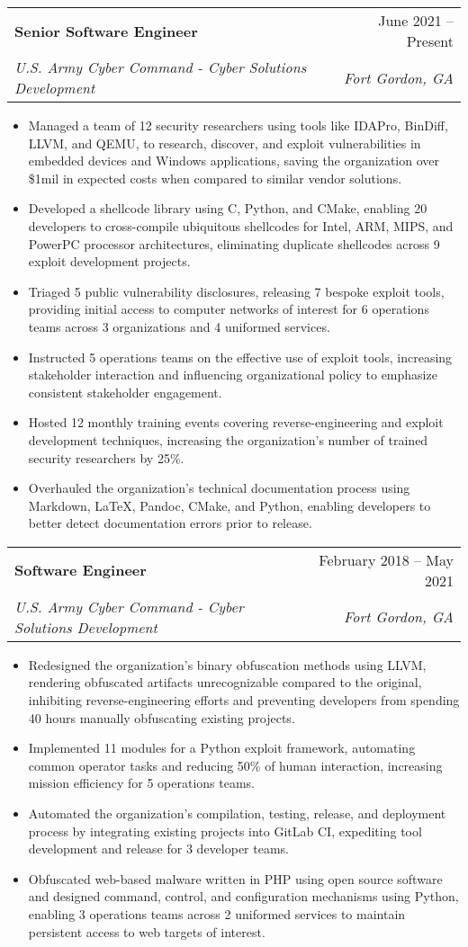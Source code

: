 \documentclass[letterpaper,11pt]{article}
\makeatletter
\newcommand{\resumeItem}[1]{
  \item[-] \small{
    {#1 \vspace{-2pt}}
  }
}
\newcommand{\resumeSubheading}[4]{
  \vspace{-2pt}\item
    \begin{tabular*}{0.97\textwidth}[t]{l@{\extracolsep{\fill}}r}
      \textbf{#1} & #2 \\
      \textit{\small#3} & \textit{\small #4} \\
    \end{tabular*}\vspace{-7pt}
}
\newcommand{\resumeItemListStart}{\begin{itemize}[rightmargin=\dimexpr\linewidth-17cm-\leftmargin\relax]}
\newcommand{\resumeItemListEnd}{\end{itemize}\vspace{-5pt}}
\makeatother
\begin{document}
\resumeSubheading
{Senior Software Engineer}{June 2021 – Present}
{U.S. Army Cyber Command - Cyber Solutions Development}{Fort Gordon, GA}
\resumeItemListStart
\resumeItem{Managed a team of 12 security researchers using tools like IDAPro, BinDiff, LLVM, and QEMU, to research, discover, and exploit vulnerabilities in embedded devices and Windows applications, saving the organization over \$1mil in expected costs when compared to similar vendor solutions.}
\resumeItem{Developed a shellcode library using C, Python, and CMake, enabling 20 developers to cross-compile ubiquitous shellcodes for Intel, ARM, MIPS, and PowerPC processor architectures, eliminating duplicate shellcodes across 9 exploit development projects.}
\resumeItem{Triaged 5 public vulnerability disclosures, releasing 7 bespoke exploit tools, providing initial access to computer networks of interest for 6 operations teams across 3 organizations and 4 uniformed services.}
\resumeItem{Instructed 5 operations teams on the effective use of exploit tools, increasing stakeholder interaction and influencing organizational policy to emphasize consistent stakeholder engagement.}
\resumeItem{Hosted 12 monthly training events covering reverse-engineering and exploit development techniques, increasing the organization's number of trained security researchers by 25\%.}
\resumeItem{Overhauled the organization's technical documentation process using Markdown, LaTeX, Pandoc, CMake, and Python, enabling developers to better detect documentation errors prior to release.}
\resumeItemListEnd

\resumeSubheading
{Software Engineer}{February 2018 – May 2021}
{U.S. Army Cyber Command - Cyber Solutions Development}{Fort Gordon, GA}
\resumeItemListStart
\resumeItem{Redesigned the organization's binary obfuscation methods using LLVM, rendering obfuscated artifacts unrecognizable compared to the original, inhibiting reverse-engineering efforts and preventing developers from spending 40 hours manually obfuscating existing projects.}
\resumeItem{Implemented 11 modules for a Python exploit framework, automating common operator tasks and reducing 50\% of human interaction, increasing mission efficiency for 5 operations teams.}
\resumeItem{Automated the organization's compilation, testing, release, and deployment process by integrating existing projects into GitLab CI, expediting tool development and release for 3 developer teams.}
\resumeItem{Obfuscated web-based malware written in PHP using open source software and designed command, control, and configuration mechanisms using Python, enabling 3 operations teams across 2 uniformed services to maintain persistent access to web targets of interest.}
\resumeItemListEnd
\end{document}
